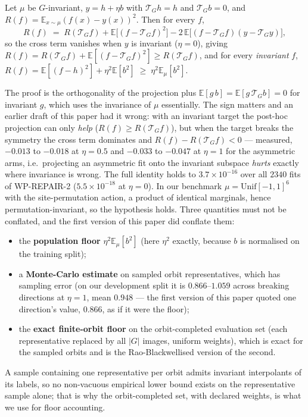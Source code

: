 \documentclass{neurips_2024}
\newcommand{\Tg}{\mathcal{T}_G}
\begin{document}
\begin{proposition}
\label{prop:floor}
Let $\mu$ be $G$-invariant, $y=h+\eta b$ with $\Tg h=h$ and $\Tg b=0$, and
$R(f)=\mathbb{E}_{x\sim\mu}(f(x)-y(x))^2$. Then for every $f$,
\begin{equation}
  R(f)\;=\;R(\Tg f)+\mathbb{E}\bigl[(f-\Tg f)^2\bigr]-2\,\mathbb{E}\bigl[(f-\Tg f)(y-\Tg y)\bigr],
\end{equation}
so the cross term vanishes when $y$ is invariant ($\eta=0$), giving
$R(f)=R(\Tg f)+\mathbb{E}[(f-\Tg f)^2]\ge R(\Tg f)$, and for every \emph{invariant} $f$,
$R(f)=\mathbb{E}[(f-h)^2]+\eta^2\mathbb{E}[b^2]\;\ge\;\eta^2\mathbb{E}_\mu[b^2]$.
\end{proposition}

The proof is the orthogonality of the projection plus
$\mathbb{E}[g\,b]=\mathbb{E}[g\,\Tg b]=0$ for invariant $g$, which uses the invariance of
$\mu$ essentially. The sign matters and an earlier draft of this paper had it wrong: with
an invariant target the post-hoc projection can only \emph{help} ($R(f)\ge R(\Tg f)$), but
when the target breaks the symmetry the cross term dominates and $R(f)-R(\Tg f)<0$ ---
measured, $-0.013$ to $-0.018$ at $\eta{=}0.5$ and $-0.033$ to $-0.047$ at $\eta{=}1$ for
the asymmetric arms, i.e.\ projecting an asymmetric fit onto the invariant subspace
\emph{hurts} exactly where invariance is wrong. The full identity holds to
$3.7\times10^{-16}$ over all $2340$ fits of WP-REPAIR-2 ($5.5\times10^{-18}$ at
$\eta{=}0$). In our benchmark $\mu=\mathrm{Unif}[-1,1]^6$ with the site-permutation
action, a product of identical marginals, hence permutation-invariant, so the hypothesis
holds. Three quantities must not be conflated, and the first version of this paper did
conflate them:
\begin{itemize}[leftmargin=1.4em,itemsep=1pt,topsep=1pt]
  \item the \textbf{population floor} $\eta^2\mathbb{E}_\mu[b^2]$ (here $\eta^2$ exactly,
        because $b$ is normalised on the training split);
  \item a \textbf{Monte-Carlo estimate} on sampled orbit representatives, which has
        sampling error (on our development split it is $0.866$--$1.059$ across breaking
        directions at $\eta{=}1$, mean $0.948$ --- the first version of this paper quoted
        one direction's value, $0.866$, as if it were the floor);
  \item the \textbf{exact finite-orbit floor} on the orbit-completed evaluation set (each
        representative replaced by all $|G|$ images, uniform weights), which is exact for
        the sampled orbits and is the Rao-Blackwellised version of the second.
\end{itemize}
A sample containing one representative per orbit admits invariant interpolants of its
labels, so no non-vacuous empirical lower bound exists on the representative sample
alone; that is why the orbit-completed set, with declared weights, is what we use for
floor accounting.
\end{document}
